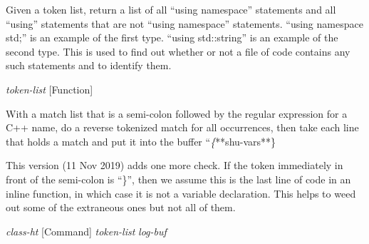 \begin{doc-string}
Given a token list, return a list of all ``using namespace'' statements and
all ``using'' statements that are not ``using namespace'' statements.  ``using
namespace std;'' is an example of the first type.  ``using std::string'' is an
example of the second type.  This is used to find out whether or not a file of
code contains any such statements and to identify them.
\end{doc-string}

\vspace{1em}
\noindent
{}
\usebox{\funcname}\emph{token-list}
 \hfill [Function]

\begin{doc-string}
With a match list that is a semi-colon followed by the regular expression for
a C++ name, do a reverse tokenized match for all occurrences, then take each
line that holds a match and put it into the buffer ``\emph\{**shu-vars**\.\}

This version (11 Nov 2019) adds one more check.  If the token immediately in
front of the semi-colon is ``\}'', then we assume this is the last line of code
in an inline function, in which case it is not a variable declaration.  This
helps to weed out some of the extraneous ones but not all of them.
\end{doc-string}

\vspace{1em}
\noindent
{}
\usebox{\funcname}\emph{class-ht}
 \hfill [Command]
\hspace*{\wd\funcname}\emph{token-list}
\hspace*{\wd\funcname}\emph{log-buf}

